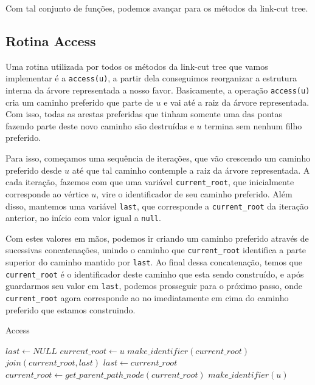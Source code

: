 Com tal conjunto de funções, podemos avançar para os métodos da link-cut tree.

\subsection{Rotina Access}
\label{subsection:lct-access}

Uma rotina utilizada por todos os métodos da link-cut tree que vamos implementar é a \texttt{access(u)}, a partir dela conseguimos reorganizar a estrutura interna da árvore representada a nosso favor. Basicamente, a operação \texttt{access(u)} cria um caminho preferido que parte de $u$ e vai até a raiz da árvore representada. Com isso, todas as arestas preferidas que tinham somente uma das pontas fazendo parte deste novo caminho são destruídas e $u$ termina sem nenhum filho preferido.

Para isso, começamos uma sequência de iterações, que vão crescendo um caminho preferido desde $u$ até que tal caminho contemple a raiz da árvore representada. A cada iteração, fazemos com que uma variável \texttt{current\_root}, que inicialmente corresponde ao vértice $u$, vire o identificador de seu caminho preferido. Além disso, mantemos uma variável \texttt{last}, que corresponde a \texttt{current\_root} da iteração anterior, no início com valor igual a \texttt{null}.

Com estes valores em mãos, podemos ir criando um caminho preferido através de sucessivas concatenações, unindo o caminho que \texttt{current\_root} identifica a parte superior do caminho mantido por \texttt{last}. Ao final dessa concatenação, temos que \texttt{current\_root} é o identificador deste caminho que esta sendo construído, e após guardarmos seu valor em \texttt{last}, podemos prosseguir para o próximo passo, onde \texttt{current\_root} agora corresponde ao no imediatamente em cima do caminho preferido que estamos construindo.

\begin{algorithm}[h!]
    \caption{Access}\label{lct:access}
    \begin{algorithmic}
        \State $last \gets NULL$
        \State $current\_root \gets u$
        \State {}
        \State $make\_identifier(current\_root)$
        \State {}
        \State $join(current\_root, last)$
        \State $last \gets current\_root$
        \State $current\_root \gets get\_parent\_path\_node(current\_root)$
        \State $make\_identifier(u)$
        \EndWhile
        \EndFunction
    \end{algorithmic}
\end{algorithm}

